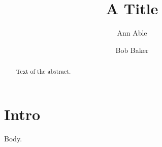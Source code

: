 \documentclass{aastex701}
\begin{document}
\title{A Title}
\author{Ann Able}
\author{Bob Baker}
\begin{abstract}
Text of the abstract.
\end{abstract}
\section{Intro}
Body.
\end{document}
